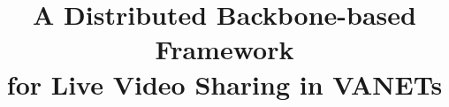 \documentclass{sig-alternate-2013}
\begin{document}
\title{A Distributed Backbone-based Framework \\
for Live Video Sharing in VANETs}
%
%
%
%
%
\end{document}
